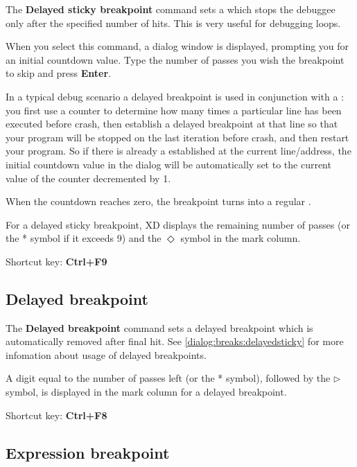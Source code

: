 The {\bf Delayed sticky breakpoint} command sets a
which stops the debuggee only after the specified number of hits.
This is very useful for debugging loops.

When you select this command, a dialog window is displayed,
prompting you for an initial countdown value. Type the number
of passes you wish the breakpoint to skip and press {\bf Enter}.


In a typical debug scenario a delayed breakpoint is used in conjunction with 
a : you first use a counter to 
determine how many times a particular line has been executed before crash,
then establish a delayed breakpoint at that line so that your program will
be stopped on the last iteration before crash, and then restart your program.
So if there is already a 
established at the current line/address, the initial countdown
value in the dialog will be automatically set to the current value 
of the counter decremented by 1. 

When the countdown reaches zero, the breakpoint turns into a
regular .

For a delayed sticky breakpoint, XD displays the remaining number of
passes (or the * symbol if it exceeds 9) and the $\Diamond$ symbol in the mark column.

Shortcut key: {\bf Ctrl+F9}

\subsection{Delayed breakpoint}
\label{dialog:breaks:delayed}

The {\bf Delayed breakpoint} command sets a delayed breakpoint
which is automatically removed after final hit.
See \ref{dialog:breaks:delayedsticky} for more infomation about
usage of delayed breakpoints.

A digit equal to the number of passes left (or the * symbol),
followed by the $\rhd$ symbol, is displayed in the mark column
for a delayed breakpoint.

Shortcut key: {\bf Ctrl+F8}

\subsection{Expression breakpoint}
\label{dialog:breaks:expression}

